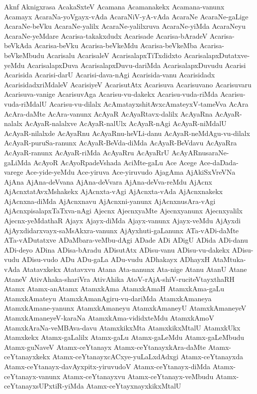 {Aknf
Aknigxrasa
AcakaSxteV
Acamana
Acamanakekx
Acamana-vanunx
Acamayx
AcaraNa-yoVgayx-vAda
AcaraNiV-yA-vAda
AcaraNe
AcaraNe-gaLige
AcaraNe-beVku
AcaraNe-yalilx
AcaraNe-yalilxruva
AcaraNe-yiMda
AcaraNeyu
AcaraNe-yeMdare
Acarisa-takakxdudx
Acarisade
Acarisa-bAradeV
Acarisa-beVkAda
Acarisa-beVku
Acarisa-beVkeMdu
Acarisa-beVkeMba
Acarisa-beVkeMbudu
Acarisalu
AcarisaleV
AcarisalapxTiTxdidxto
AcarisalapxDutatxve-yeMdu
AcarisalapxDuva
AcarisalapxDuvu-dariMda
AcarisalapxDuvudu
Acarisi
Acarisida
Acarisi-darU
Acarisi-dava-nAgi
Acarisida-vanu
Acarisidadx
AcarisidadxriMdaleV
AcarisiyeV
AcarisutAtx
Acarisuva
Acarisuvano
Acarisuvaru
Acarisuva-vanige
AcarisuvAga
Acarisu-vu-dakekx
Acarisu-vuda-riMda
Acarisu-vuda-riMdalU
Acarisu-vu-dilalx
AcAmatayxshitAvxcAmateyxV-tameVva
AcAra
AcAra-daMte
AcAra-vanunx
AcAyaR
AcAyaRtavx-dalilx
AcAyaRna
AcAyaR-nalalx
AcAyaR-nalalxve
AcAyaR-nalUlx
AcAyaR-nAgi
AcAyaR-niMdalU
AcAyaR-nilalxde
AcAyaRnu
AcAyaRnu-heVLi-danu
AcAyaR-neMdAgu-vu-dilalx
AcAyaR-puruSa-ranunx
AcAyaR-BeVda-diMda
AcAyaR-BeVdavu
AcAyaRra
AcAyaR-ranunx
AcAyaR-riMda
AcAyaRru
AcAyaRrU
AcAyARnusaraNe-gaLiMda
AcAyoR
AcAyoRpadeVshada
AciMte-gaLu
Ace
Acege
Ace-daDada-varege
Ace-yide-yeMdu
Ace-yiruva
Ace-yiruvudo
AjagAma
AjAkiSxVreVNa
AjAna
AjAna-deVvana
AjAna-deVvara
AjAna-deVva-reMdu
AjAcnx
AjAcnxtatAvxMshakekx
AjAcnxta-vAgi
AjAcnxta-vAda
AjAcnxnakekx
AjAcnxna-diMda
AjAcnxnavu
AjAcnxni-yanunx
AjAcnxnusAra-vAgi
AjAcnxpisalapxTaTxva-nAgi
Ajecnx
AjecnxyaMte
Ajecnxyanunx
Ajecnxyalilx
Ajecnx-yeMdathaR
Ajayx
Ajayx-diMda
Ajayx-vanunx
Ajayx-veMdu
AjAyxdi
AjAyxdidarxvayx-saMsAkxra-vanunx
AjAyxhuti-gaLanunx
ATa-vADi-daMte
ATa-vADutatxve
ADaMbara-veMbu-dAgi
ADade
ADi
ADigU
ADida
ADi-danu
ADi-deyo
ADina
ADisa-bAradu
ADisutAtx
ADisu-vanu
ADisu-vu-dakekx
ADisu-vudu
ADisu-vudo
ADu
ADu-gaLa
ADu-vudu
ADhakayx
ADhayxH
AtaMtuka-vAda
Atatavxkekx
Atatavxvu
Atana
Ata-nanunx
Ata-nige
Atanu
AtanU
Atane
AtaneV
AtivAhaka-shariVra
AtivAhika
AtoV-rAjA-shiV-ruciteVtayxthaRH
Atamx
Atamx-anAtamx
AtamxkAma
AtamxkAmaH
AtamxkAma-gaLu
AtamxkAmateyu
AtamxkAmanAgiru-vu-dariMda
AtamxkAmaneya
AtamxkAmane-yanunx
AtamxkAmaneyu
AtamxkAmaneyU
AtamxkAmaneyeV
AtamxkAmaneyeV-karaNa
AtamxkAma-vididxteMdu
AtamxkAmoV
AtamxkAraNa-veMBAva-davu
AtamxkikxMta
AtamxkikxMtalU
AtamxkUkx
Atamxkekx
Atamx-gaLalilx
Atamx-gaLu
Atamx-gaLeMdu
Atamx-gaLeMbudu
Atamx-guNaveV
Atamx-ceYtanayx
Atamx-ceYtanayxkAra-daMte
Atamx-ceYtanayxkekx
Atamx-ceYtanayxcACxye-yuLaLxdAdxgi
Atamx-ceYtanayxda
Atamx-ceYtanayx-davAyxpitx-yiruvudoV
Atamx-ceYtanayx-diMda
Atamx-ceYtanayx-vanunx
Atamx-ceYtanayxvu
Atamx-ceYtanayx-veMbudu
Atamx-ceYtanayxsUPxtiR-yiMda
Atamx-ceYtayxnayxkikxMtalU
}
